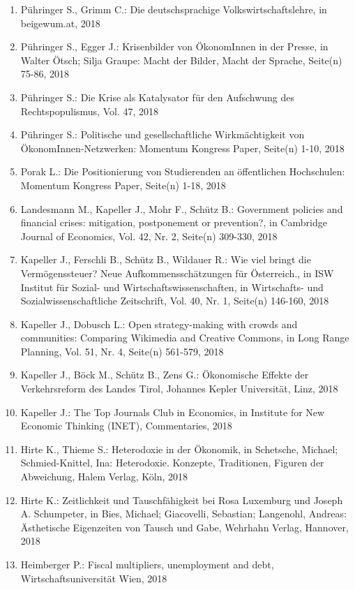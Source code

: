 \begin{enumerate}
	 \item Pühringer S., Grimm C.: Die deutschsprachige Volkswirtschaftslehre, in beigewum.at, 2018
	 \item Pühringer S., Egger J.: Krisenbilder von ÖkonomInnen in der Presse, in Walter Ötsch; Silja Graupe: Macht der Bilder, Macht der Sprache, Seite(n) 75-86, 2018
	 \item Pühringer S.: Die Krise als Katalysator für den Aufschwung des Rechtspopulismus, Vol. 47, 2018
	 \item Pühringer S.: Politische und gesellschaftliche Wirkmächtigkeit von ÖkonomInnen-Netzwerken: Momentum Kongress Paper, Seite(n) 1-10, 2018
	 \item Porak L.: Die Positionierung von Studierenden an öffentlichen Hochschulen: Momentum Kongress Paper, Seite(n) 1-18, 2018
	 \item Landesmann M., Kapeller J., Mohr F., Schütz B.: Government policies and financial crises: mitigation, postponement or prevention?, in Cambridge Journal of Economics, Vol. 42, Nr. 2, Seite(n) 309-330, 2018
	 \item Kapeller J., Ferschli B., Schütz B., Wildauer R.: Wie viel bringt die Vermögenssteuer? Neue Aufkommensschätzungen für Österreich., in ISW Institut für Sozial- und Wirtschaftswissenschaften, in Wirtschafts- und Sozialwissenschaftliche Zeitschrift, Vol. 40, Nr. 1, Seite(n) 146-160, 2018
	 \item Kapeller J., Dobusch L.: Open strategy-making with crowds and communities: Comparing Wikimedia and Creative Commons, in Long Range Planning, Vol. 51, Nr. 4, Seite(n) 561-579, 2018
	 \item Kapeller J., Böck M., Schütz B., Zens G.: Ökonomische Effekte der Verkehrsreform des Landes Tirol, Johannes Kepler Universität, Linz, 2018
	 \item Kapeller J.: The Top Journals Club in Economics, in Institute for New Economic Thinking (INET), Commentaries, 2018
	 \item Hirte K., Thieme S.: Heterodoxie in der Ökonomik, in Schetsche, Michael; Schmied-Knittel, Ina: Heterodoxie. Konzepte, Traditionen, Figuren der Abweichung, Halem Verlag, Köln, 2018
	 \item Hirte K.: Zeitlichkeit und Tauschfähigkeit bei Rosa Luxemburg und Joseph A. Schumpeter, in Bies, Michael; Giacovelli, Sebastian; Langenohl, Andreas: Ästhetische Eigenzeiten von Tausch und Gabe, Wehrhahn Verlag, Hannover, 2018
	 \item Heimberger P.: Fiscal multipliers, unemployment and debt, Wirtschaftsuniversität Wien, 2018

\end{enumerate}
